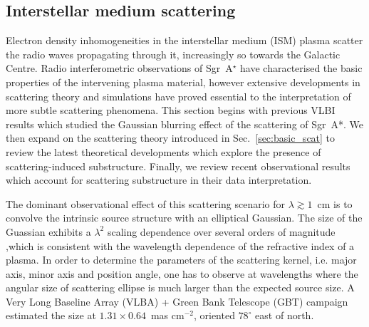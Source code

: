 \subsection{Interstellar medium scattering}\label{sec:ism_scat}

Electron density inhomogeneities in the interstellar medium (ISM) plasma scatter the radio waves propagating through it, increasingly so towards the Galactic Centre. Radio interferometric observations of Sgr~A$^\star$ have characterised the basic properties of the intervening plasma material, however extensive developments in scattering theory and simulations have proved essential to the interpretation of more subtle scattering phenomena. This section begins with previous VLBI results which studied the Gaussian blurring effect of the scattering of Sgr~A*. We then expand on the scattering theory introduced in Sec.~\ref{sec:basic_scat} to review the latest theoretical developments which explore the presence of scattering-induced substructure. Finally, we review recent observational results which account for scattering substructure in their data interpretation. 


The dominant observational effect of this scattering scenario for $\lambda \gtrsim 1$~cm is to convolve the intrinsic source structure with an elliptical Gaussian. The size of the Guassian exhibits a $\lambda^2$ scaling dependence over several orders of magnitude \citep[Fig.~\ref{fig:scattering_law}][]{Backer_1978, Shen_2005, Bower_2006, Lu_2011},which is consistent with the wavelength dependence of the refractive index of a plasma. In order to determine the parameters of the scattering kernel, i.e. major axis, minor axis and position angle,  one has to observe at wavelengths where the angular size of scattering ellipse is much larger than the expected source size. A Very Long Baseline Array (VLBA) + Green Bank Telescope (GBT) campaign \citep{Bower_2006} estimated the size at $1.31 \times 0.64$~mas cm$^{-2}$, oriented $78^\circ$ east of north. 


